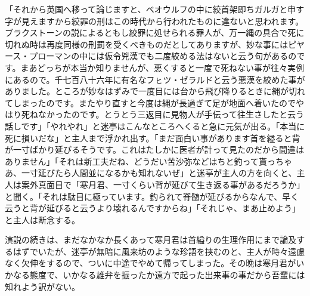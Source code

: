 \documentclass[12pt, openright]{book}
\begin{document}
「それから英国へ移って論じますと、ベオウルフの中に絞首架即ちガルガと申す字が見えますから絞罪の刑はこの時代から行われたものに違ないと思われます。ブラクストーンの説によるともし絞罪に処せられる罪人が、万一縄の具合で死に切れぬ時は再度同様の刑罰を受くべきものだとしてありますが、妙な事にはピヤース・プローマンの中には仮令兇漢でも二度絞める法はないと云う句があるのです。まあどっちが本当か知りませんが、悪くすると一度で死ねない事が往々実例にあるので。千七百八十六年に有名なフㇶツ・ゼラルドと云う悪漢を絞めた事がありました。ところが妙なはずみで一度目には台から飛び降りるときに縄が切れてしまったのです。またやり直すと今度は縄が長過ぎて足が地面へ着いたのでやはり死ねなかったのです。とうとう三返目に見物人が手伝って往生さしたと云う話しです」「やれやれ」と迷亭はこんなところへくると急に元気が出る。「本当に死に損いだな」と主人まで浮かれ出す。「まだ面白い事があります首を縊ると背が一寸ばかり延びるそうです。これはたしかに医者が計って見たのだから間違はありません」「それは新工夫だね、どうだい苦沙弥などはちと釣って貰っちゃあ、一寸延びたら人間並になるかも知れないぜ」と迷亭が主人の方を向くと、主人は案外真面目で「寒月君、一寸くらい背が延びて生き返る事があるだろうか」と聞く。「それは駄目に極っています。釣られて脊髄が延びるからなんで、早く云うと背が延びると云うより壊れるんですからね」「それじゃ、まあ止めよう」と主人は断念する。

演説の続きは、まだなかなか長くあって寒月君は首縊りの生理作用にまで論及するはずでいたが、迷亭が無暗に風来坊のような珍語を挟むのと、主人が時々遠慮なく欠伸をするので、ついに中途でやめて帰ってしまった。その晩は寒月君がいかなる態度で、いかなる雄弁を振ったか遠方で起った出来事の事だから吾輩には知れよう訳がない。
\end{document}
